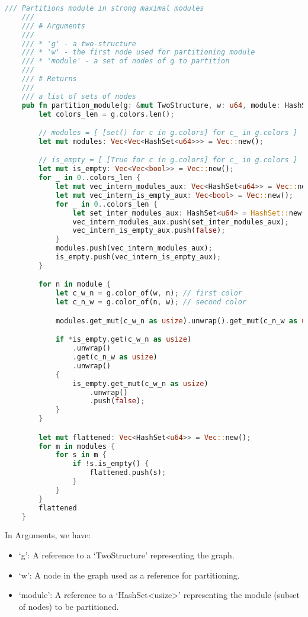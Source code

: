 \begin{lstlisting}[language=Rust, style=rust, caption={Defining the partition module}, label={lst:rust-define-partition module}, firstnumber=1]
    /// Partitions module in strong maximal modules
    ///
    /// # Arguments
    ///
    /// * 'g' - a two-structure
    /// * 'w' - the first node used for partitioning module
    /// * 'module' - a set of nodes of g to partition
    ///
    /// # Returns
    ///
    /// a list of sets of nodes
    pub fn partition_module(g: &mut TwoStructure, w: u64, module: HashSet<u64>) -> Vec<HashSet<u64>> {
        let colors_len = g.colors.len();

        // modules = [ [set() for c in g.colors] for c_ in g.colors ]
        let mut modules: Vec<Vec<HashSet<u64>>> = Vec::new();

        // is_empty = [ [True for c in g.colors] for c_ in g.colors ]
        let mut is_empty: Vec<Vec<bool>> = Vec::new();
        for _ in 0..colors_len {
            let mut vec_intern_modules_aux: Vec<HashSet<u64>> = Vec::new();
            let mut vec_intern_is_empty_aux: Vec<bool> = Vec::new();
            for _ in 0..colors_len {
                let set_inter_modules_aux: HashSet<u64> = HashSet::new();
                vec_intern_modules_aux.push(set_inter_modules_aux);
                vec_intern_is_empty_aux.push(false);
            }
            modules.push(vec_intern_modules_aux);
            is_empty.push(vec_intern_is_empty_aux);
        }

        for n in module {
            let c_w_n = g.color_of(w, n); // first color
            let c_n_w = g.color_of(n, w); // second color

            modules.get_mut(c_w_n as usize).unwrap().get_mut(c_n_w as usize).unwrap().insert(n);

            if *is_empty.get(c_w_n as usize)
                .unwrap()
                .get(c_n_w as usize)
                .unwrap()
            {
                is_empty.get_mut(c_w_n as usize)
                    .unwrap()
                    .push(false);
            }
        }

        let mut flattened: Vec<HashSet<u64>> = Vec::new();
        for m in modules {
            for s in m {
                if !s.is_empty() {
                    flattened.push(s);
                }
            }
        }
        flattened
    }
\end{lstlisting}

In Arguments, we have:
\begin{itemize}
    \item `g': A reference to a `TwoStructure' representing the graph.
    \item `w': A node in the graph used as a reference for partitioning.
    \item `module': A reference to a `HashSet<usize>' representing the module (subset of nodes) to be partitioned.
\end{itemize}

